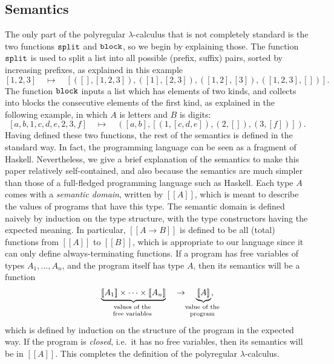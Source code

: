 \documentclass[a4paper,UKenglish,cleveref, autoref, thm-restate]{lipics-v2021}
\newcommand{\myunderbrace}[2]{\underbrace{#1}_{\mathclap{\text{\scriptsize 
\begin{tabular}{c}
	#2
\end{tabular} }}}}
\newcommand{\sem}[1]{[\![#1]\!]}
\begin{document}
\subsection{Semantics} The only part of the polyregular $\lambda$-calculus that is not completely standard is the two functions $\mathtt{split}$ and $\mathtt{block}$, so we begin by explaining those.  The function 
   $\mathtt{split}$ is used to split a list into all possible (prefix, suffix) pairs, sorted by increasing prefixes,  as  explained in this example 
\begin{equation} \label{def-split}
[1,2,3] 
\quad \mapsto \quad 
[([],[1,2,3]), ([1],[2,3]), ([1,2],[3]), ([1,2,3],[])].
\end{equation}
    The function $\mathtt{block}$ inputs a list which has elements of two kinds, and collects into blocks the consecutive  elements of the first kind, as explained in the following example, in which $A$ is letters and $B$ is digits:
  \begin{equation} \label{def-block}
        [a, b, 1, c, d, e, 2, 3, f] 
        \quad \mapsto \quad ([a,b], [(1,[c,d,e]),(2,[]),(3,[f])]).
        \end{equation}
Having defined these two functions, the rest of the semantics is defined in the standard way. In fact, the programming language can be seen as a fragment of Haskell. Nevertheless, we give a brief  explanation of  the semantics to make this paper relatively self-contained, and also because the semantics are much simpler than those of a full-fledged programming language such as Haskell.  Each type $A$ comes with a \emph{semantic domain}, written by $\sem A$, which is meant to describe the values of programs that have this type. The semantic domain is defined naively by induction on the type structure, with the type constructors having the expected meaning. In particular, $\sem{A \to B}$ is defined to be all (total) functions from $\sem A$ to $\sem B$, which is appropriate to our language since it can only define always-terminating functions.  
If a program has free variables of types $A_1,\ldots,A_n$, and the program itself has type $A$, then its semantics will be a function 
\begin{align*}
\myunderbrace{\sem {A_1} \times \cdots \times \sem{A_n}}{values of the\\ free variables} 
\quad \to \quad 
\myunderbrace{\sem{A}}{value of the\\ program},
\end{align*}
which is  defined by induction on the structure of the program in the expected way.
If the program is \emph{closed}, i.e.~it has no free variables, then its semantics will be in $\sem A$. This completes the definition of the polyregular $\lambda$-calculus.
\end{document}
